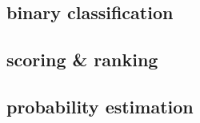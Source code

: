 \documentclass[cheatsheet.tex]{subfiles}
\begin{document}
\subsection{binary classification}
\lipsum[1-2]
\subsection{scoring \& ranking}
\lipsum[1-2]
\subsection{probability estimation}
\lipsum[1-2]
\end{document}
